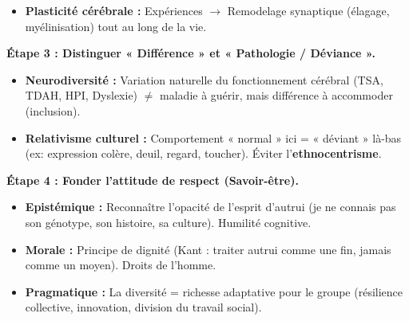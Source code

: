 \documentclass[11pt]{article}
\begin{document}
\begin{methode}
\begin{itemize}
        \item \textbf{Plasticité cérébrale :} Expériences $\to$ Remodelage synaptique (élagage, myélinisation) tout au long de la vie.
    \end{itemize}
    \textbf{Étape 3 : Distinguer « Différence » et « Pathologie / Déviance ».}
    \begin{itemize}
        \item \textbf{Neurodiversité :} Variation naturelle du fonctionnement cérébral (TSA, TDAH, HPI, Dyslexie) $\neq$ maladie à guérir, mais différence à accommoder (inclusion).
        \item \textbf{Relativisme culturel :} Comportement « normal » ici = « déviant » là-bas (ex: expression colère, deuil, regard, toucher). Éviter l'\textbf{ethnocentrisme}.
    \end{itemize}
    \textbf{Étape 4 : Fonder l'attitude de respect (Savoir-être).}
    \begin{itemize}
        \item \textbf{Epistémique :} Reconnaître l'opacité de l'esprit d'autrui (je ne connais pas son génotype, son histoire, sa culture). Humilité cognitive.
        \item \textbf{Morale :} Principe de dignité (Kant : traiter autrui comme une fin, jamais comme un moyen). Droits de l'homme.
        \item \textbf{Pragmatique :} La diversité = richesse adaptative pour le groupe (résilience collective, innovation, division du travail social).
    \end{itemize}
\end{methode}
\end{document}
